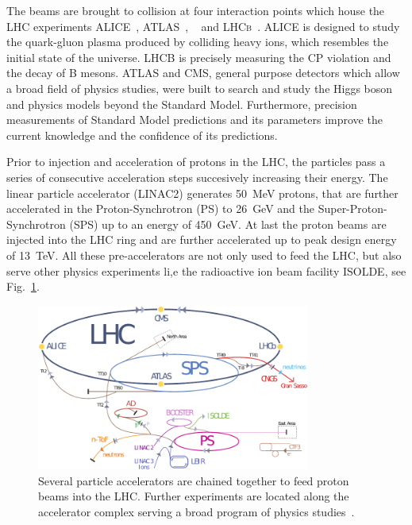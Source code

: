 The beams are brought to collision at four interaction points which house the
LHC experiments ALICE~\cite{ALICE}, ATLAS~\cite{ATLASa},
\CMS~\cite{Bayatian:922757,Ball:2007zza,Chatrchyan:2008aa} and \textsc{LHCb}~\cite{LHCb}. ALICE is
designed to study the quark-gluon plasma produced by colliding heavy ions, which
resembles the initial state of the universe. LHCB is precisely measuring the CP
violation and the decay of B mesons. ATLAS and CMS, general purpose detectors
which allow a broad field of physics studies, were built to search and study the
Higgs boson and physics models beyond the Standard Model. Furthermore, precision
measurements of Standard Model predictions and its parameters improve the
current knowledge and the confidence of its predictions.

Prior to injection and acceleration of protons in the LHC, the particles pass a
series of consecutive acceleration steps succesively increasing their energy.
The linear particle accelerator (LINAC2) generates \SI{50}{\mega \electronvolt}
protons, that are further accelerated in the Proton-Synchrotron (PS) to
\SI{26}{\giga \electronvolt} and the Super-Proton-Synchrotron (SPS) up to an
energy of \SI{450}{\giga \electronvolt}. At last the proton beams are injected
into the LHC ring and are further accelerated up to peak design energy of
\SI{13}{\tera\electronvolt}. All these pre-accelerators are not only used to
feed the LHC, but also serve other physics experiments li,e the radioactive ion
beam facility ISOLDE, see Fig.~\ref{fig:lhc_complex}.

\begin{figure}[htp]
    \centering
    \includegraphics[width=0.8\textwidth]{figures/cms_detector/lhc_accelerator_chain.pdf}
    \caption[\CERN accelerator complex]{Several particle accelerators are
        chained together to feed proton beams into the LHC. Further experiments are
        located along the accelerator complex serving a broad program of physics
        studies~\cite{LHC:COMPLEX}.}
    \label{fig:lhc_complex}
\end{figure}

